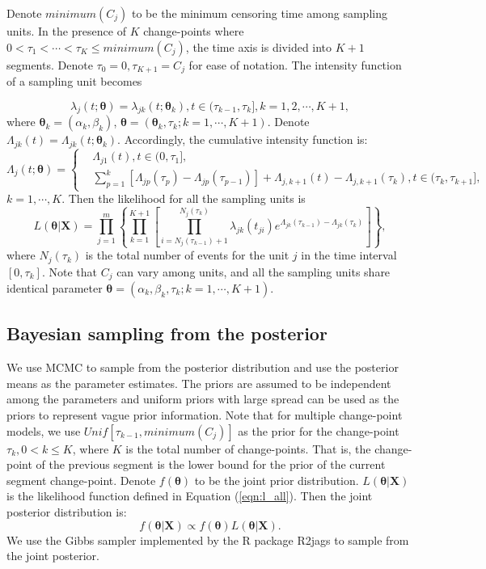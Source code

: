 \documentclass[12pt]{article}
\numberwithin{equation}{section}
\begin{document}
Denote $minimum(C_j)$ to be the minimum censoring time among sampling units. In the presence of $K$ change-points where $0< \tau_1 < \cdots<\tau_K \leq minimum(C_j)$, the time axis is divided into $K+1$ segments. Denote $\tau_0 =0, \tau_{K+1} = C_j$ for ease of notation. The intensity function of a sampling unit  becomes 

\begin{equation*}
\lambda_j(t;\pmb\theta)=
 \lambda_{jk}(t;\pmb\theta_k),t\in(\tau_{k-1},\tau_k], k = 1, 2, \cdots,K+1, 
\end{equation*}
where $\pmb\theta_k = (\alpha_k,\beta_k)$, $\pmb\theta = (\pmb\theta_k,\tau_k;k = 1, \cdots, K+1)$. Denote $\Lambda_{jk}(t)=\Lambda_{jk}(t;\pmb\theta_k)$. Accordingly, the cumulative intensity function is: 
\begin{equation*}
\Lambda_j(t;\pmb\theta)=\begin{cases}
&\Lambda_{j1}(t), t\in(0,\tau_1],\\
&\sum_{p=1}^{k}\left[ \Lambda_{jp}(\tau_p)-\Lambda_{jp}(\tau_{p-1})\right]
 +\Lambda_{j,k+1}(t)-\Lambda_{j,k+1}(\tau_k), t\in(\tau_{k},\tau_{k+1}], 
\end{cases} 
\end{equation*}
$ k = 1, \cdots,K.$ Then the likelihood for all the sampling units is
\begin{equation}\label{eqn:l_all}
L(\pmb\theta|\pmb X) = \prod_{j=1}^{m}\left\lbrace \prod\limits_{k=1}^{K+1}\left[ \prod\limits_{i=N_j(\tau_{k-1})+1}^{N_j(\tau_k)} \lambda_{jk}(t_{ji})e^{\Lambda_{jk}(\tau_{k-1})-\Lambda_{jk}(\tau_{k})}\right]  \right\rbrace, 
\end{equation} 
where $N_{j}(\tau_k)$ is the total number of events for the unit $j$ in the time interval $[0,\tau_k]$. Note that $C_j$ can vary among units, and all the sampling units share identical  parameter $\pmb\theta = (\alpha_k, \beta_k,\tau_k;k = 1, \cdots, K+1)$. 
\subsection{Bayesian sampling from the posterior}
We use MCMC to sample from the posterior distribution and use the posterior means as the parameter estimates. The priors are assumed to be independent among the parameters and uniform priors with large spread can be used as the priors to represent vague prior information. Note that for multiple change-point models, we use $Unif[\tau_{k-1}, minimum(C_j)]$ as the prior for the change-point $\tau_{k}, 0<k\leq K$, where $K$ is the total number of change-points. That is, the  change-point of the previous segment is the lower bound for the prior of the current segment change-point. Denote $f(\pmb \theta)$ to be the joint prior distribution. $L(\pmb\theta|\pmb X)$ is the likelihood function defined in Equation (\ref{eqn:l_all}). Then the joint posterior distribution is: 
\begin{equation*}
	f(\pmb \theta|\pmb X) \propto f(\pmb \theta)L(\pmb\theta|\pmb X).
\end{equation*}
We use the Gibbs sampler implemented by the R package R2jags \citep{Su2015} to sample from the joint posterior.
\end{document}

